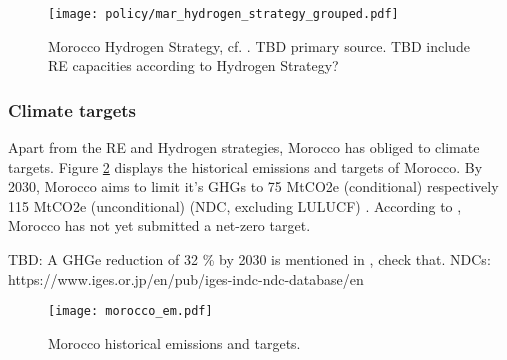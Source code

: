 \begin{figure}
    \centering
    \texttt{[image: policy/mar\_hydrogen\_strategy\_grouped.pdf]}
    \caption{Morocco Hydrogen Strategy, cf. \cite[p. 14]{Ersoy2022}. TBD primary source. TBD include RE capacities according to Hydrogen Strategy?}
    \label{fig:mar_hydrogen_strategy}
\end{figure}

\subsubsection{Climate targets}
Apart from the RE and Hydrogen strategies, Morocco has obliged to climate targets.
Figure \ref{fig:morocco_em} displays the historical emissions and targets of Morocco.
By 2030, Morocco aims to limit it's GHGs to 75 MtCO2e (conditional) 
respectively 115 MtCO2e (unconditional) (NDC, excluding LULUCF) \cite{CAT2021}. 
According to \cite{CAT2021}, Morocco has not yet submitted a net-zero target.

TBD: A GHGe reduction of 32 \% by 2030 is mentioned in \cite[5]{Boulakhbar2020}, check that.
NDCs: https://www.iges.or.jp/en/pub/iges-indc-ndc-database/en 

\begin{figure}[h!]
    \centering
    \texttt{[image: morocco\_em.pdf]}
    \caption{Morocco historical emissions and targets.}
    \label{fig:morocco_em}
\end{figure}